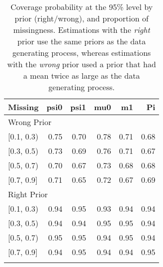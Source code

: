 \begin{table}[ht]
\centering
\begin{tabular}{lrrrrr}
  \toprule
Missing & psi0 & psi1 & mu0 & m1 & Pi \\ 
  \midrule
\multicolumn{6}{l}{Wrong Prior}\\
{[0.1, 0.3)} & 0.75 & 0.70 & 0.78 & 0.71 & 0.68 \\ 
  {[0.3, 0.5)} & 0.73 & 0.69 & 0.76 & 0.71 & 0.67 \\ 
  {[0.5, 0.7)} & 0.70 & 0.67 & 0.73 & 0.68 & 0.68 \\ 
  {[0.7, 0.9]} & 0.71 & 0.65 & 0.72 & 0.67 & 0.69 \\ 
   \midrule
\multicolumn{6}{l}{Right Prior}\\
{[0.1, 0.3)} & 0.94 & 0.95 & 0.93 & 0.94 & 0.94 \\ 
  {[0.3, 0.5)} & 0.94 & 0.94 & 0.95 & 0.95 & 0.94 \\ 
  {[0.5, 0.7)} & 0.95 & 0.95 & 0.94 & 0.95 & 0.94 \\ 
  {[0.7, 0.9]} & 0.94 & 0.95 & 0.94 & 0.94 & 0.95 \\ 
   \bottomrule
\multicolumn{6}{l}{}\\
\end{tabular}
\caption{Coverage probability at the 95\% level by prior (right/wrong), and proportion of missingness. Estimations with the \emph{right} prior use the same priors as the data generating process, whereas estimations with the \emph{wrong} prior used a prior that had a mean twice as large as the data generating process.} 
\label{tab:coverage95-method-missigness}
\end{table}
